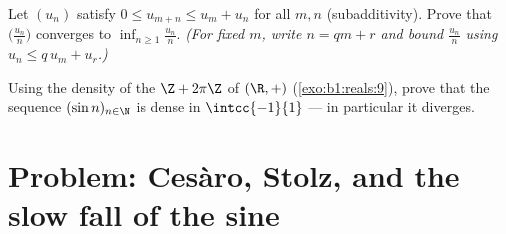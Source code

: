 \begin{exercise}[$\star\star\star$]\label{exo:b1:seq:11}
Let $(u_n)$ satisfy $0 \leq u_{m+n} \leq u_m + u_n$ for all $m, n$
(subadditivity). Prove that $\bigl(\frac{u_n}{n}\bigr)$ converges to
$\inf_{n \geq 1} \frac{u_n}{n}$. \emph{(For fixed $m$, write $n = qm
+ r$ and bound $\frac{u_n}{n}$ using $u_n \leq q\,u_m + u_r$.)}
\end{exercise}

\begin{exercise}[$\star\star\star$]\label{exo:b1:seq:12}
Using the density of the  $\Z + 2\pi\Z$ of $(\R, +)$
(\cref{exo:b1:reals:9}), prove that the sequence $(\sin n)_{n \in
\N}$ is dense in $\intcc{-1}{1}$ --- in particular it diverges.
\end{exercise}

\section{Problem: Ces\`aro, Stolz, and the slow fall of the sine}

